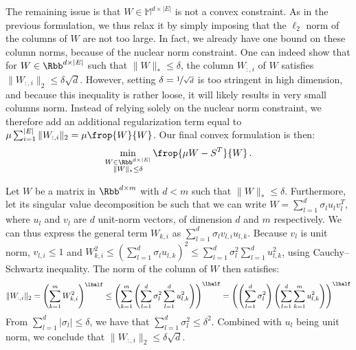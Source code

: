 The remaining issue is that $W\in \mathbb{M}^{d\times |E|}$ is not a convex constraint. As in the
previous formulation, we thus relax it by simply imposing that the $\ell_2$ norm of the columns of
$W$ are not too large. In fact, we already have one bound on these column norms, because of the
nuclear norm constraint. One can indeed show that for $W\in \Rbb^{d\times |E|}$ such that $\|W\|_*
\leq \delta$, the \ith{} column $W_{:,i}$ of $W$ satisfies $\|W_{:,i}\|_2 \leq \delta\sqrt{d}$.
However, setting $\delta = \nicefrac{1}{\sqrt{d}}$ is too stringent in high dimension, and because
this inequality is rather loose, it will likely results in very small columns norm. Instead of
relying solely on the nuclear norm constraint, we therefore add an additional regularization term
equal to $\mu \sum_{i=1}^{|E|} \|W_{:,i}\|_2 = \mu \frop{W}{W}$. Our final convex formulation is
then:
\begin{equation}
  \label{eq:edge_FW}
  \min_{\substack{W\in \Rbb^{d\times |E|} \\ \|W\|_* \leq \delta}} \frop{\mu W - S^T}{W} \,.
\end{equation}

\begin{aside}
  Let $W$ be a matrix in $\Rbb^{d\times m}$ with $d < m$ such that $\|W\|_* \leq \delta$.
  Furthermore, let its singular value decomposition be such that we can write $W = \sum_{l=1}^d
  \sigma_l u_l v_l^T$, where $u_l$ and $v_l$ are $d$ unit-norm vectors, of dimension $d$ and $m$
  respectively. We can thus express the general term $W_{k,i}$ as $\sum_{l=1}^d \sigma_l v_{l,i}
  u_{l,k}$. Because $v_l$ is unit norm, $v_{l,i} \leq 1$ and $W_{k,i}^2 \leq \left( \sum_{l=1}^d
  \sigma_l u_{l,k} \right)^2 \leq \sum_{l=1}^d \sigma_l^2 \sum_{l=1}^d u_{l,k}^2$, using
  Cauchy--Schwartz inequality. The norm of the \ith{} column of $W$ then satisfies:
  \begin{equation*}
    \|W_{:,i}\|_2 = \left( \sum_{k=1}^m W_{k,i}^2 \right)^\lhalf
    \leq \left( \sum_{k=1}^m \left( \sum_{l=1}^d \sigma_l^2 \sum_{l=1}^d u_{l,k}^2 \right) \right)^\lhalf
    = \left( \left( \sum_{l=1}^d \sigma_l^2 \right) \left( \sum_{l=1}^d \sum_{k=1}^m u_{l,k}^2 \right) \right)^\lhalf
  \end{equation*}
  From $\sum_{l=1}^d |\sigma_l | \leq \delta$, we have that $\sum_{l=1}^d \sigma_l^2 \leq \delta^2$.
  Combined with $u_l$ being unit norm, we conclude that $\|W_{:,i}\|_2 \leq \delta\sqrt{d}$.
\end{aside}

